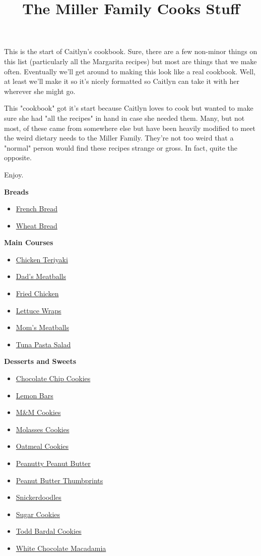 \documentclass{article}
\title{The Miller Family Cooks Stuff}
\begin{document}
This is the start of Caitlyn's cookbook. Sure, there are a few non-minor things on this list (particularly all the Margarita recipes) but most are things that we make often. Eventually
we'll get around to making this look like a real cookbook. Well, at least we'll make it so
it's nicely formatted so Caitlyn can take it with her wherever she might go.

This "cookbook" got it's start because Caitlyn loves to cook but wanted to make sure she
had "all the recipes" in hand in case she needed them. Many, but not most, of these came
from somewhere else but have been heavily modified to meet the weird dietary needs to the
Miller Family. They're not too weird that a "normal" person would find these recipes
strange or gross. In fact, quite the opposite.

Enjoy.

\textbf{Breads}
\begin{itemize}
    \item \href{french-bread.pdf}{French Bread}
    \item \href{wheat-bread.pdf}{Wheat Bread}
\end{itemize}

\medskip

\textbf{Main Courses}
\begin{itemize}
    \item \href{chicken-teriyaki.pdf}{Chicken Teriyaki}
    \item \href{dads-meatballs.pdf}{Dad's Meatballs}
    \item \href{fried-chicken.pdf}{Fried Chicken}
    \item \href{lettuce-wraps.pdf}{Lettuce Wraps}
    \item \href{moms-meatballs.pdf}{Mom's Meatballs}
    \item \href{tuna-pasta-salad.pdf}{Tuna Pasta Salad}
\end{itemize}

\medskip

\textbf{Desserts and Sweets}
\begin{itemize}
    \item \href{chocolate-chip.pdf}{Chocolate Chip Cookies}
    \item \href{lemon-bars.pdf}{Lemon Bars}
    \item \href{m-and-m-cookies.pdf}{M\&M Cookies}
    \item \href{molasses-cookies.pdf}{Molasses Cookies}
    \item \href{oatmeal-cookies.pdf}{Oatmeal Cookies}
    \item \href{peanut-butter.pdf}{Peanutty Peanut Butter}
    \item \href{peanut-butter-thumbprints.pdf}{Peanut Butter Thumbprints}
    \item \href{snickerdoodles.pdf}{Snickerdoodles}
    \item \href{sugar-cookies.pdf}{Sugar Cookies}
    \item \href{todd-bardal.pdf}{Todd Bardal Cookies}
    \item \href{white-choco-macadamia.pdf}{White Chocolate Macadamia}
\end{itemize}
\end{document}
